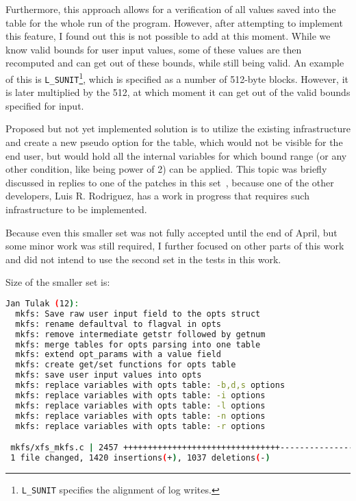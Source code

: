 Furthermore, this approach allows for a verification of all values saved into
the table for the whole run of the program. However, after attempting to
implement this feature, I found out this is not possible to add at this moment.
While we know valid bounds for user input values, some of these values are then
recomputed and can get out of these bounds, while still being valid. An example
of this is {\tt L\_SUNIT}\footnote{{\tt L\_SUNIT} specifies the alignment of
log writes.}, which is specified as a number of 512-byte blocks. However, it is
later multiplied by the 512, at which moment it can get out of the valid bounds
specified for input.

Proposed but not yet implemented solution is to utilize the existing
infrastructure and create a new pseudo option for the table, which would not be
visible for the end user, but would hold all the internal variables for which
bound range (or any other condition, like being power of 2) can be applied.
This topic was briefly discussed in replies to one of the patches in this
set~\cite{secondSetSplitOtherVars}, because one of the other developers, Luis
R. Rodriguez, has a work in progress that requires such infrastructure to be
implemented.

Because even this smaller set was not fully accepted until the end of April,
but some minor work was still required, I further focused on other parts of
this work and did not intend to use the second set in the tests in this work.

Size of the smaller set is:
\begin{lstlisting}[frame=none, basicstyle=\footnotesize\ttfamily, language=Bash, numbers=none, numberstyle=\tiny\color{black},caption= {Git statistics for the first part of the second set after its breaking into smaller parts~\cite{secondSetSplitFirst}.}]
Jan Tulak (12):
  mkfs: Save raw user input field to the opts struct
  mkfs: rename defaultval to flagval in opts
  mkfs: remove intermediate getstr followed by getnum
  mkfs: merge tables for opts parsing into one table
  mkfs: extend opt_params with a value field
  mkfs: create get/set functions for opts table
  mkfs: save user input values into opts
  mkfs: replace variables with opts table: -b,d,s options
  mkfs: replace variables with opts table: -i options
  mkfs: replace variables with opts table: -l options
  mkfs: replace variables with opts table: -n options
  mkfs: replace variables with opts table: -r options

 mkfs/xfs_mkfs.c | 2457 ++++++++++++++++++++++++++++++++-----------------------
 1 file changed, 1420 insertions(+), 1037 deletions(-)
\end{lstlisting}


